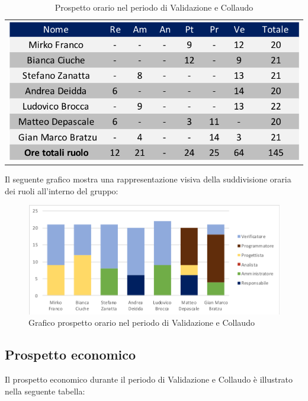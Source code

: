 \begin{table}[!ht]
	\begin{center}
		\begin{tabular}{c}
			\includegraphics[scale=0.90]{images/tabellaValidazioneCollaudo.png}
		\end{tabular}
		\caption{Prospetto orario nel periodo di Validazione e Collaudo}
	\end{center}
\end{table}

Il seguente grafico mostra una rappresentazione visiva della suddivisione oraria dei ruoli all'interno del gruppo:
\begin{figure}[!ht]
	\begin{center}
		\includegraphics[scale=0.90]{images/grafoValidazioneCollaudo.png}
		\caption{Grafico prospetto orario nel periodo di Validazione e Collaudo}
	\end{center}
\end{figure}

\subsection{Prospetto economico}
Il prospetto economico durante il periodo di Validazione e Collaudo è illustrato nella seguente tabella:


